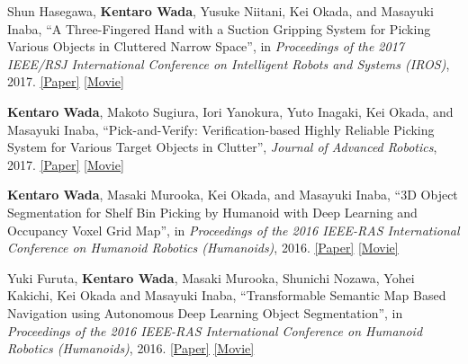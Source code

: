 \documentclass[letterpaper,MMMyyyy,nonstop]{simpleresumecv}
\begin{document}
\begin{body}
\BigGapNoBreak

Shun Hasegawa, \textbf{Kentaro Wada}, Yusuke Niitani, Kei Okada, and Masayuki Inaba,
``A Three-Fingered Hand with a Suction Gripping System for Picking Various Objects in Cluttered Narrow Space'',
in \textit{Proceedings of the 2017 IEEE/RSJ International Conference on Intelligent Robots and Systems (IROS)}, 2017.
\href{https://drive.google.com/open?id=1JK_o178iRMlQUQQgIlBLlltsj7cwMDeE}{\underline{[Paper]}}
\href{https://drive.google.com/open?id=1JPzAq4B47cjH35bhAjGRFMXyUN7voO4o}{\underline{[Movie]}}

\BigGapNoBreak

\textbf{Kentaro Wada}, Makoto Sugiura, Iori Yanokura, Yuto Inagaki, Kei Okada, and Masayuki Inaba,
``Pick-and-Verify: Verification-based Highly Reliable Picking System for Various Target Objects in Clutter'',
\textit{Journal of Advanced Robotics}, 2017.
\href{http://www.tandfonline.com/doi/abs/10.1080/01691864.2016.1269672?journalCode=tadr20}{\underline{[Paper]}}
\href{http://www.tandfonline.com/doi/suppl/10.1080/01691864.2016.1269672?scroll=top}{\underline{[Movie]}}

\BigGapNoBreak

\textbf{Kentaro Wada}, Masaki Murooka, Kei Okada, and Masayuki Inaba,
``3D Object Segmentation for Shelf Bin Picking by Humanoid with Deep Learning and Occupancy Voxel Grid Map'',
in \textit{Proceedings of the 2016 IEEE-RAS International Conference on Humanoid Robotics (Humanoids)}, 2016.
\href{http://ieeexplore.ieee.org/document/7803415/}{\underline{[Paper]}}
\href{https://drive.google.com/open?id=19YwO1LXAcRCfS8rAM5paxc2SEzGE3odA}{\underline{[Movie]}}

\BigGapNoBreak

Yuki Furuta, \textbf{Kentaro Wada}, Masaki Murooka, Shunichi Nozawa, Yohei Kakichi, Kei Okada and Masayuki Inaba,
``Transformable Semantic Map Based Navigation using Autonomous Deep Learning Object Segmentation'',
in \textit{Proceedings of the 2016 IEEE-RAS International Conference on Humanoid Robotics (Humanoids)}, 2016.
\href{http://ieeexplore.ieee.org/document/7803338/}{\underline{[Paper]}}
\href{https://drive.google.com/open?id=1ljJQ4SUjkNT1S1GWb4h7h__zbStz3oOo}{\underline{[Movie]}}


\end{body}
\end{document}
